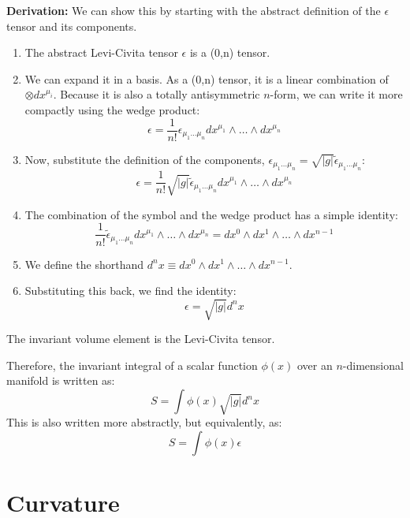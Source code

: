 \documentclass[11pt, a4paper]{report}
\begin{document}
\textbf{Derivation:}
We can show this by starting with the abstract definition of the $\epsilon$ tensor and its components.
\begin{enumerate}
    \item The abstract Levi-Civita tensor $\epsilon$ is a (0,n) tensor.
    \item We can expand it in a basis. As a (0,n) tensor, it is a linear combination of $\otimes dx^{\mu_i}$. Because it is also a totally antisymmetric $n$-form, we can write it more compactly using the wedge product:
    \[
        \epsilon = \frac{1}{n!} \epsilon_{\mu_1 \dots \mu_n} dx^{\mu_1} \wedge \dots \wedge dx^{\mu_n}
    \]
    \item Now, substitute the definition of the components, $\epsilon_{\mu_1 \dots \mu_n} = \sqrt{|g|} \tilde{\epsilon}_{\mu_1 \dots \mu_n}$:
    \[
        \epsilon = \frac{1}{n!} \sqrt{|g|} \tilde{\epsilon}_{\mu_1 \dots \mu_n} dx^{\mu_1} \wedge \dots \wedge dx^{\mu_n}
    \]
    \item The combination of the symbol and the wedge product has a simple identity:
    \[
        \frac{1}{n!} \tilde{\epsilon}_{\mu_1 \dots \mu_n} dx^{\mu_1} \wedge \dots \wedge dx^{\mu_n} = dx^0 \wedge dx^1 \wedge \dots \wedge dx^{n-1}
    \]
    \item We define the shorthand $d^n x \equiv dx^0 \wedge dx^1 \wedge \dots \wedge dx^{n-1}$.
    \item Substituting this back, we find the identity:
    \begin{equation}
        \epsilon = \sqrt{|g|} d^n x
    \end{equation}
\end{enumerate}
The invariant volume element is the Levi-Civita tensor.

Therefore, the invariant integral of a scalar function $\phi(x)$ over an $n$-dimensional manifold is written as:
\begin{equation}
    S = \int \phi(x) \sqrt{|g|} d^n x
\end{equation}
This is also written more abstractly, but equivalently, as:
\begin{equation}
    S = \int \phi(x) \epsilon
\end{equation}

\chapter{Curvature}
\end{document}
